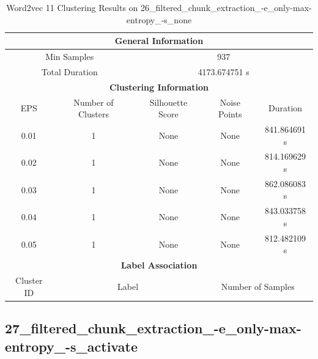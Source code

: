 \begin{longtable}{|c|c|c|c|c|}
\caption{Word2vec 11 Clustering Results on 26\_filtered\_chunk\_extraction\_-e\_only-max-entropy\_-s\_none} \label{tab:26_filtered_chunk_extraction_-e_only-max-entropy_-s_none_word2vec_11_clustering_results}\\
\hline
\multicolumn{5}{|c|}{\textbf{General Information}} \\
\hline
\multicolumn{2}{|c|}{Min Samples} & \multicolumn{3}{c|}{937} \\
\multicolumn{2}{|c|}{Total Duration} & \multicolumn{3}{c|}{4173.674751 s} \\
\hline
\multicolumn{5}{|c|}{\textbf{Clustering Information}} \\
\hline
EPS & Number of Clusters & Silhouette Score & Noise Points & Duration \\
0.01 & 1 & None & None & 841.864691 s\\
0.02 & 1 & None & None & 814.169629 s\\
0.03 & 1 & None & None & 862.086083 s\\
0.04 & 1 & None & None & 843.033758 s\\
0.05 & 1 & None & None & 812.482109 s\\
\hline
\multicolumn{5}{|c|}{\textbf{Label Association}} \\
\hline
Cluster ID & \multicolumn{2}{c|}{Label} & \multicolumn{2}{c|}{Number of Samples} \\
\hline
\end{longtable}


\subsection{27\_filtered\_chunk\_extraction\_-e\_only-max-entropy\_-s\_activate}

